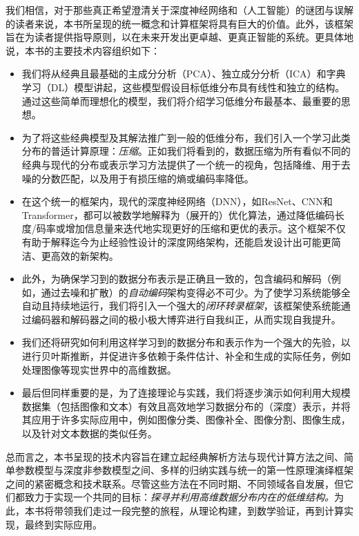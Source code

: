 \documentclass[../../book-main.tex]{subfiles}
\begin{document}
我们相信，对于那些真正希望澄清关于深度神经网络和（人工智能）的谜团与误解的读者来说，本书所呈现的统一概念和计算框架将具有巨大的价值。此外，该框架旨在为读者提供指导原则，以在未来开发出更卓越、更真正智能的系统。更具体地说，本书的主要技术内容组织如下：
\begin{itemize}
\item 我们将从经典且最基础的主成分分析（PCA）、独立成分分析（ICA）和字典学习（DL）模型讲起，这些模型假设目标低维分布具有线性和独立的结构。通过这些简单而理想化的模型，我们将介绍学习低维分布最基本、最重要的思想。

\item 为了将这些经典模型及其解法推广到一般的低维分布，我们引入一个学习此类分布的普适计算原理：{\em 压缩}。正如我们将看到的，数据压缩为所有看似不同的经典与现代的分布或表示学习方法提供了一个统一的视角，包括降维、用于去噪的分数匹配，以及用于有损压缩的熵或编码率降低。

\item 在这个统一的框架内，现代的深度神经网络（DNN），如ResNet、CNN和Transformer，都可以被数学地解释为（展开的）优化算法，通过降低编码长度/码率或增加信息量来迭代地实现更好的压缩和更优的表示。这个框架不仅有助于解释迄今为止经验性设计的深度网络架构，还能启发设计出可能更简洁、更高效的新架构。

\item 此外，为确保学习到的数据分布表示是正确且一致的，包含编码和解码（例如，通过去噪和扩散）的{\em 自动编码}架构变得必不可少。为了使学习系统能够全自动且持续地运行，我们将引入一个强大的{\em 闭环转录框架}，该框架使系统能通过编码器和解码器之间的极小极大博弈进行自我纠正，从而实现自我提升。

\item 我们还将研究如何利用这样学习到的数据分布和表示作为一个强大的先验，以进行贝叶斯推断，并促进许多依赖于条件估计、补全和生成的实际任务，例如处理图像等现实世界中的高维数据。

\item 最后但同样重要的是，为了连接理论与实践，我们将逐步演示如何利用大规模数据集（包括图像和文本）有效且高效地学习数据分布的（深度）表示，并将其应用于许多实际应用中，例如图像分类、图像补全、图像分割、图像生成，以及针对文本数据的类似任务。
\end{itemize}

总而言之，本书呈现的技术内容旨在建立起经典解析方法与现代计算方法之间、简单参数模型与深度非参数模型之间、多样的归纳实践与统一的第一性原理演绎框架之间的紧密概念和技术联系。尽管这些方法在不同时期、不同领域各自发展，但它们都致力于实现一个共同的目标：{\em 探寻并利用高维数据分布内在的低维结构。}为此，本书将带领我们走过一段完整的旅程，从理论构建，到数学验证，再到计算实现，最终到实际应用。
\end{document}
